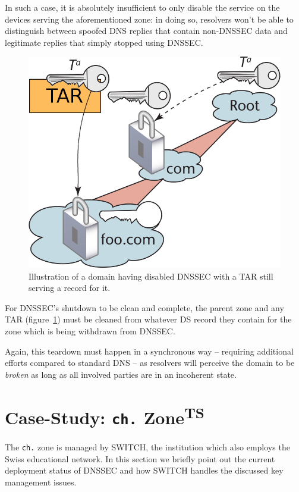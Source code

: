 \documentclass[a4paper,twocolumn]{scrartcl}
\newcommand{\wbts}{\textsuperscript{TS}}
\begin{document}
In such a case, it is absolutely insufficient to only disable the service on the devices serving the aforementioned  zone: in doing so, resolvers won't be able to distinguish between spoofed DNS replies that contain non-DNSSEC data and legitimate replies that simply stopped using DNSSEC.

\begin{figure}
  \includegraphics[width=\linewidth]{trust-chain-tar-no-key}
  \caption{Illustration of a domain having disabled DNSSEC with a TAR still serving a record for it.}
  \label{fig:remaining-tar}
\end{figure}

For DNSSEC's shutdown to be clean and complete, the parent zone and any TAR (figure~\ref{fig:remaining-tar}) must be cleaned from whatever DS record they contain for the zone which is being withdrawn from DNSSEC.

Again, this teardown must happen in a synchronous way -- requiring additional efforts compared to standard DNS -- as resolvers will perceive the domain to be \emph{broken} as long as all involved parties are in an incoherent state.

\section{Case-Study: \texttt{ch.} Zone\wbts}
\label{sec:case-study}

The \verb|ch.| zone is managed by SWITCH, the institution which also
employs the Swiss educational network. In this section we briefly
point out the current deployment status of DNSSEC and how SWITCH
handles the discussed key management issues.
\end{document}
